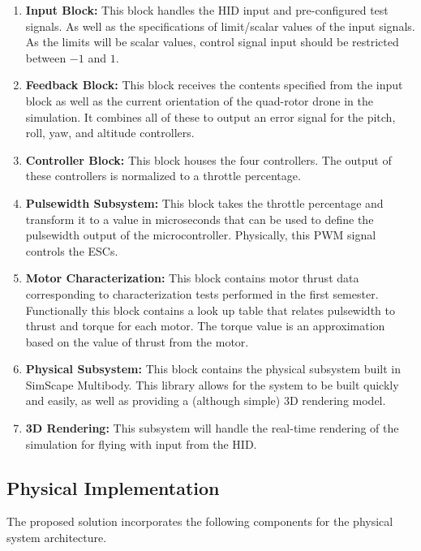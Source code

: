 \begin{enumerate}
	\item \textbf{Input Block:}  This block handles the HID input and pre-configured test signals.  As well as the specifications of limit/scalar values of the input signals.  As the limits will be scalar values, control signal input should be restricted between $-1$ and $1$.
	
	\item \textbf{Feedback Block:}  This block receives the contents specified from the input block as well as the current orientation of the quad-rotor drone in the simulation.  It combines all of these to output an error signal for the pitch, roll, yaw, and altitude controllers.
	
	\item \textbf{Controller Block:}  This block houses the four controllers.  The output of these controllers is normalized to a throttle percentage.
	
	\item \textbf{Pulsewidth Subsystem:}  This block takes the throttle percentage and transform it to a value in microseconds that can be used to define the pulsewidth output of the microcontroller.  Physically, this PWM signal controls the ESCs.
	
	\item \textbf{Motor Characterization:}  This block contains motor thrust data corresponding to characterization tests performed in the first semester.  Functionally this block contains a look up table that relates pulsewidth to thrust and torque for each motor.  The torque value is an approximation based on the value of thrust from the motor.
	
	\item \textbf{Physical Subsystem:}  This block contains the physical subsystem built in SimScape Multibody.  This library allows for the system to be built quickly and easily, as well as providing a (although simple) 3D rendering model.
	
	\item \textbf{3D Rendering:}  This subsystem will handle the real-time rendering of the simulation for flying with input from the HID.
\end{enumerate}

\subsection{Physical Implementation}

The proposed solution incorporates the following components for the physical system architecture.

